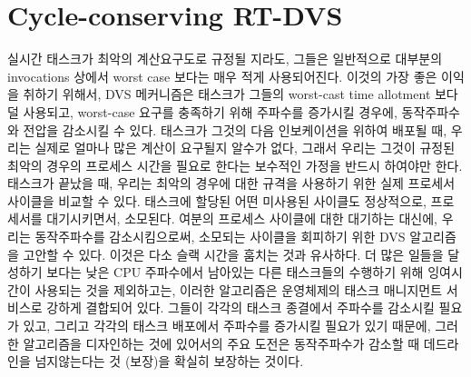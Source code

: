 \documentclass[11pt
  , a4paper
  , article
  , oneside
]{memoir}
\begin{document}
\section{Cycle-conserving RT-DVS}
실시간 태스크가 최악의 계산요구도로 규정될 지라도, 그들은 일반적으로 대부분의 invocations 상에서 worst case 보다는 매우 적게 사용되어진다. 이것의 가장 좋은 이익을 취하기 위해서, DVS 메커니즘은 태스크가 그들의 worst-cast time allotment 보다 덜 사용되고, worst-case 요구를 충족하기 위해 주파수를 증가시킬 경우에, 동작주파수와 전압을 감소시킬 수 있다. 태스크가 그것의 다음 인보케이션을 위하여 배포될 때, 우리는 실제로 얼마나 많은 계산이 요구될지 알수가 없다, 그래서 우리는 그것이 규정된 최악의 경우의 프로세스 시간을 필요로 한다는 보수적인 가정을 반드시 하여야만 한다.태스크가 끝났을 때, 우리는 최악의 경우에 대한 규격을 사용하기 위한 실제 프로세서 사이클을 비교할 수 있다. 태스크에 할당된 어떤 미사용된 사이클도 정상적으로, 프로세서를 대기시키면서, 소모된다. 여분의 프로세스 사이클에 대한 대기하는 대신에, 우리는 동작주파수를 감소시킴으로써, 소모되는 사이클을 회피하기 위한 DVS 알고리즘을 고안할 수 있다. 
이것은 다소 슬랙 시간을 훔치는 것과 유사하다. 더 많은 일들을 달성하기 보다는 낮은 CPU 주파수에서 남아있는 다른 태스크들의 수행하기 위해 잉여시간이 사용되는 것을 제외하고는, 이러한 알고리즘은 운영체제의 태스크 매니지먼트 서비스로 강하게 결합되어 있다. 그들이 각각의 태스크 종결에서 주파수를 감소시킬 필요가 있고, 그리고 각각의 태스크 배포에서 주파수를 증가시킬 필요가 있기 때문에, 
그러한 알고리즘을 디자인하는 것에 있어서의 주요 도전은 동작주파수가 감소할 때 데드라인을 넘지않는다는 것 (보장)을 확실히 보장하는 것이다. 
\end{document}
